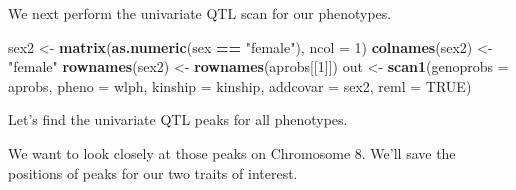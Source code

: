 \documentclass[oneside]{book}
\newenvironment{Shaded}{\begin{snugshade}}{\end{snugshade}}
\newcommand{\CommentTok}[1]{\textcolor[rgb]{0.56,0.35,0.01}{\textit{#1}}}
\newcommand{\DataTypeTok}[1]{\textcolor[rgb]{0.13,0.29,0.53}{#1}}
\newcommand{\DecValTok}[1]{\textcolor[rgb]{0.00,0.00,0.81}{#1}}
\newcommand{\KeywordTok}[1]{\textcolor[rgb]{0.13,0.29,0.53}{\textbf{#1}}}
\newcommand{\NormalTok}[1]{#1}
\newcommand{\OperatorTok}[1]{\textcolor[rgb]{0.81,0.36,0.00}{\textbf{#1}}}
\newcommand{\OtherTok}[1]{\textcolor[rgb]{0.56,0.35,0.01}{#1}}
\newcommand{\StringTok}[1]{\textcolor[rgb]{0.31,0.60,0.02}{#1}}
\begin{document}
\begin{Shaded}
\end{Shaded}

We next perform the univariate QTL scan for our phenotypes.

\begin{Shaded}
\begin{Highlighting}[]
\NormalTok{sex2 <-}\StringTok{ }\KeywordTok{matrix}\NormalTok{(}\KeywordTok{as.numeric}\NormalTok{(sex }\OperatorTok{==}\StringTok{ "female"}\NormalTok{), }\DataTypeTok{ncol =} \DecValTok{1}\NormalTok{)}
\KeywordTok{colnames}\NormalTok{(sex2) <-}\StringTok{ "female"}
\KeywordTok{rownames}\NormalTok{(sex2) <-}\StringTok{ }\KeywordTok{rownames}\NormalTok{(aprobs[[}\DecValTok{1}\NormalTok{]])}
\NormalTok{out <-}\StringTok{ }\KeywordTok{scan1}\NormalTok{(}\DataTypeTok{genoprobs =}\NormalTok{ aprobs, }\DataTypeTok{pheno =}\NormalTok{ wlph, }\DataTypeTok{kinship =}\NormalTok{ kinship, }\DataTypeTok{addcovar =}\NormalTok{ sex2, }\DataTypeTok{reml =} \OtherTok{TRUE}\NormalTok{)}
\end{Highlighting}
\end{Shaded}

Let's find the univariate QTL peaks for all phenotypes.

We want to look closely at those peaks on Chromosome 8. We'll save the
positions of peaks for our two traits of interest.

\begin{Shaded}
\end{Shaded}
\end{document}
